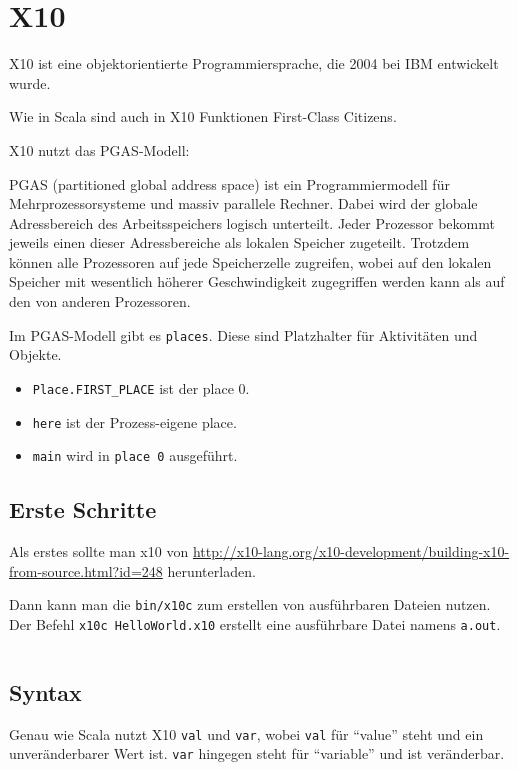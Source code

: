 \chapter{X10}%
X10 ist eine objektorientierte Programmiersprache, die 2004 bei IBM entwickelt
wurde.

Wie in Scala sind auch in X10 Funktionen First-Class Citizens.

X10 nutzt das PGAS-Modell:

\begin{definition}%
    PGAS (partitioned global address space) ist ein Programmiermodell für 
    Mehrprozessorsysteme und massiv parallele Rechner. Dabei wird der globale 
    Adressbereich des Arbeitsspeichers logisch unterteilt. Jeder Prozessor 
    bekommt jeweils einen dieser Adressbereiche als lokalen Speicher zugeteilt. 
    Trotzdem können alle Prozessoren auf jede Speicherzelle zugreifen, wobei auf 
    den lokalen Speicher mit wesentlich höherer Geschwindigkeit zugegriffen 
    werden kann als auf den von anderen Prozessoren.
\end{definition}

Im PGAS-Modell gibt es \texttt{places}. Diese sind Platzhalter für Aktivitäten
und Objekte.

\begin{itemize}
    \item \texttt{Place.FIRST\_PLACE} ist der place 0.
    \item \texttt{here} ist der Prozess-eigene place.
    \item \texttt{main} wird in \texttt{place 0} ausgeführt.
\end{itemize}

\section{Erste Schritte}
Als erstes sollte man x10 von \url{http://x10-lang.org/x10-development/building-x10-from-source.html?id=248} herunterladen.

Dann kann man die \texttt{bin/x10c} zum erstellen von ausführbaren Dateien nutzen.
Der Befehl \texttt{x10c HelloWorld.x10} erstellt eine ausführbare Datei namens
\texttt{a.out}.

\inputminted[numbersep=5pt, tabsize=4, frame=lines, label=HelloWorld.x10]{cpp}{scripts/x10/HelloWorld.x10}

\section{Syntax}
Genau wie Scala nutzt X10 \texttt{val} und \texttt{var}, wobei \texttt{val} für
\enquote{value} steht und ein unveränderbarer Wert ist. \texttt{var} hingegen
steht für \enquote{variable} und ist veränderbar.

